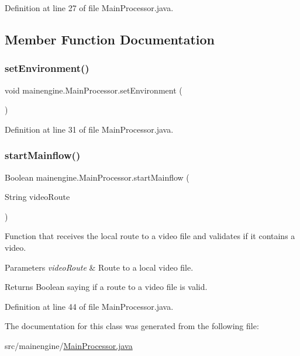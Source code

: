 Definition at line 27 of file Main\+Processor.\+java.



\subsection{Member Function Documentation}
\hypertarget{classmainengine_1_1_main_processor_aee5d6816bb2dc27ea02ef5f5c4cd3355}{}\label{classmainengine_1_1_main_processor_aee5d6816bb2dc27ea02ef5f5c4cd3355} 
\subsubsection{\texorpdfstring{set\+Environment()}{setEnvironment()}}
{\footnotesize\ttfamily void mainengine.\+Main\+Processor.\+set\+Environment (\begin{DoxyParamCaption}{ }\end{DoxyParamCaption})}



Definition at line 31 of file Main\+Processor.\+java.

\hypertarget{classmainengine_1_1_main_processor_a270957b142cfc8aa430636545b29679f}{}\label{classmainengine_1_1_main_processor_a270957b142cfc8aa430636545b29679f} 
\subsubsection{\texorpdfstring{start\+Mainflow()}{startMainflow()}}
{\footnotesize\ttfamily Boolean mainengine.\+Main\+Processor.\+start\+Mainflow (\begin{DoxyParamCaption}\item[{String}]{video\+Route }\end{DoxyParamCaption})}

Function that receives the local route to a video file and validates if it contains a video.


\begin{DoxyParams}{Parameters}
{\em video\+Route} & Route to a local video file. \\
\hline
\end{DoxyParams}
\begin{DoxyReturn}{Returns}
Boolean saying if a route to a video file is valid. 
\end{DoxyReturn}


Definition at line 44 of file Main\+Processor.\+java.



The documentation for this class was generated from the following file\+:\begin{DoxyCompactItemize}
\item 
src/mainengine/\hyperlink{_main_processor_8java}{Main\+Processor.\+java}\end{DoxyCompactItemize}
